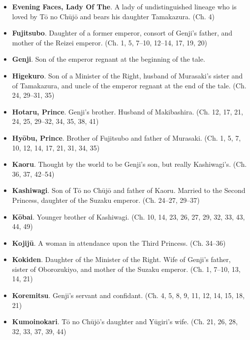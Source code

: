 \documentclass{article}
\begin{document}
\begin{multicols}{2}
\begin{itemize}[
			label=,
			leftmargin=0em,
			rightmargin=-1.5em,
			itemindent=-2em,
			nosep,
		]
		\item \textbf{Evening Faces, Lady Of The}. A lady of undistinguished lineage who is loved by Tō no Chūjō and bears his daughter Tamakazura. (Ch. 4)

		\item \textbf{Fujitsubo}. Daughter of a former emperor, consort of Genji's father, and mother of the Reizei emperor. (Ch. 1, 5, 7--10, 12--14, 17, 19, 20)

		\item \textbf{Genji}. Son of the emperor regnant at the beginning of the tale.

		\item \textbf{Higekuro}. Son of a Minister of the Right, husband of Murasaki's sister and of Tamakazura, and uncle of the emperor regnant at the end of the tale. (Ch. 24, 29--31, 35)

		\item \textbf{Hotaru, Prince}. Genji's brother. Husband of Makibashira. (Ch. 12, 17, 21, 24, 25, 29--32, 34, 35, 38, 41)

		\item \textbf{Hyōbu, Prince}. Brother of Fujitsubo and father of Murasaki. (Ch. 1, 5, 7, 10, 12, 14, 17, 21, 31, 34, 35)

		\item \textbf{Kaoru}. Thought by the world to be Genji's son, but really Kashiwagi's. (Ch. 36, 37, 42--54)

		\item \textbf{Kashiwagi}. Son of Tō no Chūjō and father of Kaoru. Married to the Second Princess, daughter of the Suzaku emperor. (Ch. 24--27, 29--37)

		\item \textbf{Kōbai}. Younger brother of Kashiwagi. (Ch. 10, 14, 23, 26, 27, 29, 32, 33, 43, 44, 49)

		\item \textbf{Kojijū}. A woman in attendance upon the Third Princess. (Ch. 34--36)

		\item \textbf{Kokiden}. Daughter of the Minister of the Right. Wife of Genji's father, sister of Oborozukiyo, and mother of the Suzaku emperor. (Ch. 1, 7--10, 13, 14, 21)

		\item \textbf{Koremitsu}. Genji's servant and confidant. (Ch. 4, 5, 8, 9, 11, 12, 14, 15, 18, 21)

		\item \textbf{Kumoinokari}. Tō no Chūjō's daughter and Yūgiri's wife. (Ch. 21, 26, 28, 32, 33, 37, 39, 44)


\end{itemize}
\end{multicols}
\end{document}
